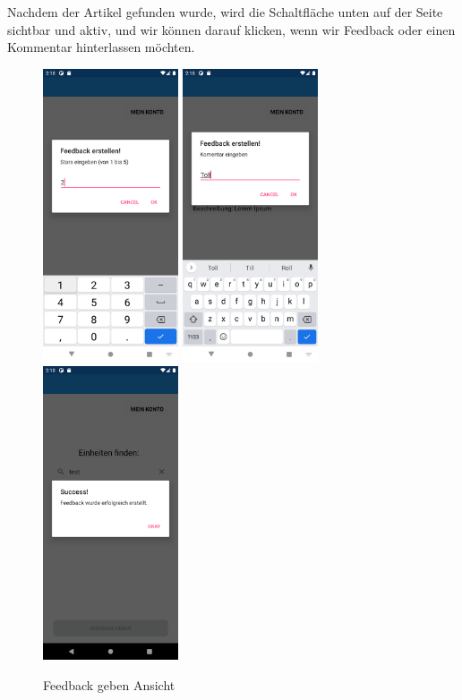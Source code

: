 Nachdem der Artikel gefunden wurde, wird die Schaltfläche unten auf der Seite sichtbar und aktiv, und wir können darauf klicken, wenn wir Feedback oder einen Kommentar hinterlassen möchten.
\begin{figure}[h]
    \begin{center}
    \includegraphics[width=4cm]{pics/Xamarin Student/10 Feedback Star.png}\hfill
    \includegraphics[width=4cm]{pics/Xamarin Student/11 Feedback comm.png}\hfill
    \includegraphics[width=4cm]{pics/Xamarin Student/12 Feedback success.png}
    \caption[HomePage]{Feedback geben Ansicht}
    \end{center}
\end{figure}
